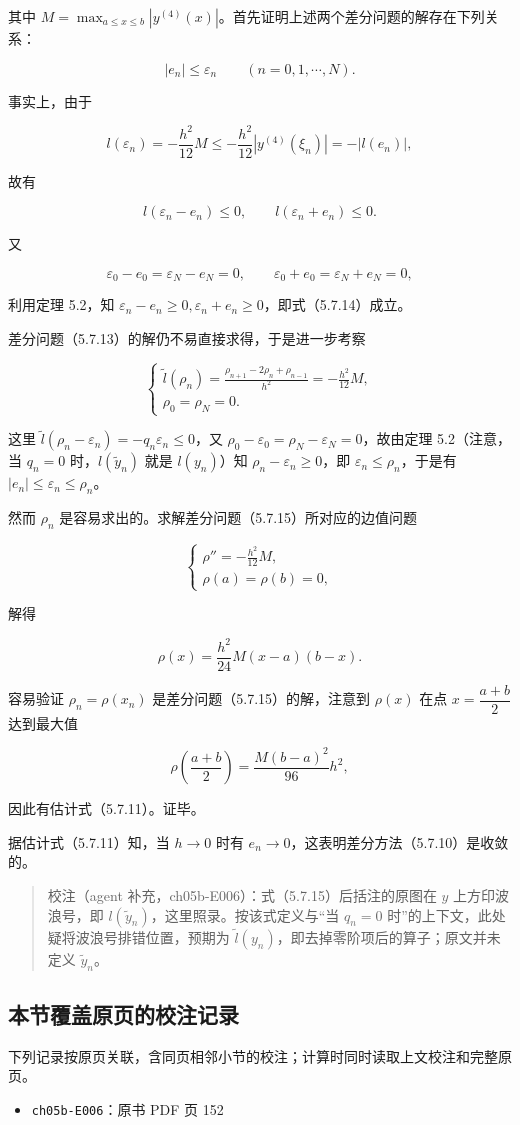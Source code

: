 \documentclass[
  10pt,
  fontset=fandol]{ctexart}
\providecommand{\tightlist}{%
  \setlength{\itemsep}{0pt}\setlength{\parskip}{0pt}}
\begin{document}
其中 \(M=\max_{a\le x\le b}|y^{(4)}(x)|\)。首先证明上述两个差分问题的解存在下列关系：

\[
|e_n|\le\varepsilon_n\qquad(n=0,1,\cdots,N).
\tag{5.7.14}
\]

事实上，由于

\[
l(\varepsilon_n)=-\frac{h^2}{12}M\le-\frac{h^2}{12}|y^{(4)}(\xi_n)|=-|l(e_n)|,
\]

故有

\[
l(\varepsilon_n-e_n)\le0,\qquad l(\varepsilon_n+e_n)\le0.
\]

又

\[
\varepsilon_0-e_0=\varepsilon_N-e_N=0,\qquad\varepsilon_0+e_0=\varepsilon_N+e_N=0,
\]

利用定理 5.2，知 \(\varepsilon_n-e_n\ge0,\varepsilon_n+e_n\ge0\)，即式（5.7.14）成立。

差分问题（5.7.13）的解仍不易直接求得，于是进一步考察

\[
\begin{cases}
\displaystyle\tilde l(\rho_n)=\frac{\rho_{n+1}-2\rho_n+\rho_{n-1}}{h^2}=-\frac{h^2}{12}M,\\[6pt]
\rho_0=\rho_N=0.
\end{cases}
\tag{5.7.15}
\]

这里 \(\tilde l(\rho_n-\varepsilon_n)=-q_n\varepsilon_n\le0\)，又 \(\rho_0-\varepsilon_0=\rho_N-\varepsilon_N=0\)，故由定理 5.2（注意，当 \(q_n=0\) 时，\(l(\tilde y_n)\) 就是 \(l(y_n)\)）知 \(\rho_n-\varepsilon_n\ge0\)，即 \(\varepsilon_n\le\rho_n\)，于是有 \(|e_n|\le\varepsilon_n\le\rho_n\)。

然而 \(\rho_n\) 是容易求出的。求解差分问题（5.7.15）所对应的边值问题

\[
\begin{cases}
\displaystyle\rho''=-\frac{h^2}{12}M,\\[6pt]
\rho(a)=\rho(b)=0,
\end{cases}
\]

解得

\[
\rho(x)=\frac{h^2}{24}M(x-a)(b-x).
\]

容易验证 \(\rho_n=\rho(x_n)\) 是差分问题（5.7.15）的解，注意到 \(\rho(x)\) 在点 \(x=\dfrac{a+b}2\) 达到最大值

\[
\rho\left(\frac{a+b}2\right)=\frac{M(b-a)^2}{96}h^2,
\]

因此有估计式（5.7.11）。证毕。

据估计式（5.7.11）知，当 \(h\to0\) 时有 \(e_n\to0\)，这表明差分方法（5.7.10）是收敛的。

\begin{quote}
校注（agent 补充，ch05b-E006）：式（5.7.15）后括注的原图在 \(y\) 上方印波浪号，即 \(l(\tilde y_n)\)，这里照录。按该式定义与``当 \(q_n=0\) 时''的上下文，此处疑将波浪号排错位置，预期为 \(\tilde l(y_n)\)，即去掉零阶项后的算子；原文并未定义 \(\tilde y_n\)。
\end{quote}

\subsection{本节覆盖原页的校注记录}\label{ux672cux8282ux8986ux76d6ux539fux9875ux7684ux6821ux6ce8ux8bb0ux5f55}

下列记录按原页关联，含同页相邻小节的校注；计算时同时读取上文校注和完整原页。

\begin{itemize}
\tightlist
\item
  \texttt{ch05b-E006}：原书 PDF 页 152
\end{itemize}
\end{document}

